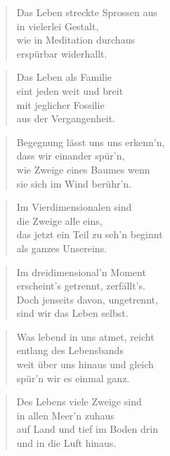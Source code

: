 \documentclass[10pt,a4paper]{article}
\begin{document}
\begin{paracol}{2}
\begin{verse}
Das Leben streckte Sprossen aus \\
in vielerlei Gestalt, \\
wie in Meditation durchaus \\
erspürbar widerhallt. \\
\end{verse}

\begin{verse}
Das Leben als Familie \\
eint jeden weit und breit \\
mit jeglicher Fossilie \\
aus der Vergangenheit. \\
\end{verse}

\begin{verse}
Begegnung lässt uns uns erkenn’n, \\
dass wir einander spür’n, \\
wie Zweige eines Baumes wenn \\
sie sich im Wind berühr’n. \\
\end{verse}

\begin{verse}
Im Vierdimensionalen sind \\
die Zweige alle eins, \\
das jetzt ein Teil zu seh’n beginnt \\
als ganzes Unsereins. \\
\end{verse}

\begin{verse}
Im dreidimensional’n Moment \\
erscheint’s getrennt, zerfällt’s. \\
Doch jenseits davon, ungetrennt, \\
sind wir das Leben selbst. \\
\end{verse}

\begin{verse}
Was lebend in uns atmet, reicht \\
entlang des Lebensbands \\
weit über uns hinaus und gleich \\
spür’n wir es einmal ganz. \\
\end{verse}

\begin{verse}
Des Lebens viele Zweige sind \\
in allen Meer’n zuhaus \\
auf Land und tief im Boden drin \\
und in die Luft hinaus. \\
\end{verse}


\end{paracol}
\end{document}
